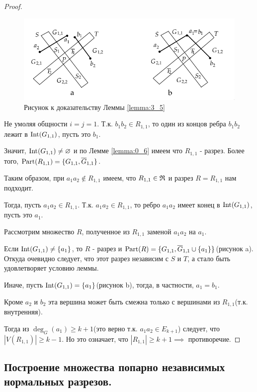 \begin{proof}
	\begin{figure}[ht]
    \centering
	\includegraphics[width=0.5\columnwidth]{figures/3_lemma_5.png}
    \caption{Рисунок к доказательству Леммы \ref{lemma:3_5}}
	\label{fig:3_lemma_5}
	\end{figure}

Не умоляя общности $i = j = 1$. 
Т.к. $b_1b_2 \in R_{1,1}$, то один из концов ребра $b_1b_2$ лежит в $\operatorname{Int}(G_{1,1})$, пусть это  $b_1$.

Значит, $\operatorname{Int}(G_{1,1}) \neq \varnothing$ и по Лемме \ref{lemma:0_6} имеем что $R_{1,1}$ - разрез.
Более того, $\operatorname{Part}(R_{1,1}) = \{G_{1,1}, \overline G_{1,1}\}$.

Таким образом, при  $a_1a_2 \not \in R_{1,1}$ имеем, что $R_{1,1} \in \mathfrak{R}$ и разрез  $R = R_{1,1}$ нам подходит.

Тогда, пусть $a_1a_2 \in R_{1,1}$.
Т.к. $a_1a_2 \in R_{1,1}$, то ребро $a_1a_2$ имеет конец в $\operatorname{Int}(G_{1,1})$, пусть это  $a_1$.

Рассмотрим множество $R$, полученное из  $R_{1,1}$ заменой  $a_1a_2$ на $a_1$.

Если $\operatorname{Int}(G_{1,1}) \neq \{a_1 \}$, то $R$ - разрез и  $\operatorname{Part}(R) = \{G_{1,1}, \overline G_{1,1} \cup \{a_1\}\}$(рисунок a).
Откуда очевидно следует, что этот разрез независим с $S$ и  $T$, а стало быть удовлетворяет условию леммы.

Иначе, пусть  $\operatorname{Int}(G_{1,1}) = \{a_1\}$(рисунок b), тогда, в частности, $a_1 = b_1$.

Кроме $a_2$ и $b_2$ эта вершина может быть смежна только с вершинами из $R_{1,1}$(т.к. внутренняя).

Тогда из $\deg_{G}(a_1) \geqslant k + 1$(это верно т.к. $a_1a_2 \in E_{k + 1}$) следует, что $|V(R_{1,1})| \geqslant k - 1$.
Но это означает, что  $|R_{1,1}| \geqslant k + 1 \implies$ противоречие.

\end{proof}

\subsection{Построение множества попарно независимых нормальных разрезов.}

